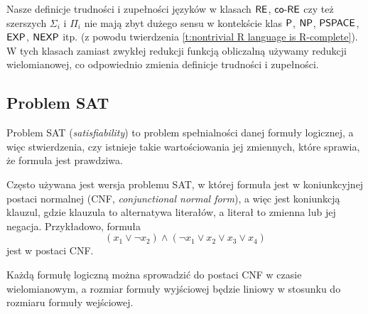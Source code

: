 Nasze definicje trudności i zupełności języków w klasach $\textsf{RE}$, $\textsf{co-RE}$ czy też szerszych $\Sigma_i$ i $\Pi_i$ nie mają zbyt dużego sensu w kontekście klas $\textsf{P}$, $\textsf{NP}$, $\textsf{PSPACE}$, $\textsf{EXP}$, $\textsf{NEXP}$ itp. (z powodu twierdzenia \ref{t:nontrivial R language is R-complete}). W tych klasach zamiast zwykłej redukcji funkcją obliczalną używamy redukcji wielomianowej, co odpowiednio zmienia definicje trudności i zupełności.

\subsection{Problem SAT}

Problem SAT (\textit{satisfiability}) to problem spełnialności danej formuły logicznej, a więc stwierdzenia, czy istnieje takie wartościowania jej zmiennych, które sprawia, że formuła jest prawdziwa.

Często używana jest wersja problemu SAT, w której formuła jest w koniunkcyjnej postaci normalnej (CNF, \textit{conjunctional normal form}), a więc jest koniunkcją klauzul, gdzie klauzula to alternatywa literałów, a literał to zmienna lub jej negacja. Przykładowo, formuła
\[ (x_1 \lor \neg x_2) \land (\neg x_1 \lor x_2 \lor x_3 \lor x_4) \]
jest w postaci CNF.

\begin{fact}
    Każdą formułę logiczną można sprowadzić do postaci CNF w czasie wielomianowym, a rozmiar formuły wyjściowej będzie liniowy w stosunku do rozmiaru formuły wejściowej.
\end{fact}

